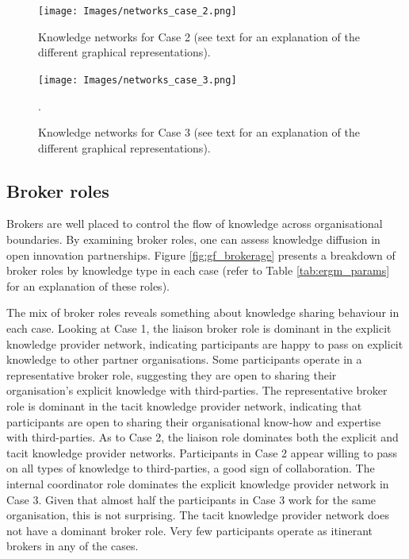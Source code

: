 \begin{figure}
\texttt{[image: Images/networks\_case\_2.png]}
\caption[Knowledge networks for Case 2]{Knowledge networks for Case 2 (see text for an explanation of the different graphical representations).}
\label{fig:network_case_2} 
\end{figure}

\begin{figure}
\texttt{[image: Images/networks\_case\_3.png]}
\caption[Knowledge networks for Case 3]{Knowledge networks for Case 3 (see text for an explanation of the different graphical representations).}. 
\label{fig:network_case_3} 
\end{figure}

\subsection{Broker roles}

Brokers are well placed to control the flow of knowledge across organisational boundaries. By examining broker roles, one can assess knowledge diffusion in open innovation partnerships. Figure \ref{fig:gf_brokerage} presents a breakdown of \citet{gould1989structures} broker roles by knowledge type in each case (refer to Table \ref{tab:ergm_params} for an explanation of these roles).  \medskip

The mix of broker roles reveals something about knowledge sharing behaviour in each case. Looking at Case 1, the liaison broker role is dominant in the explicit knowledge provider network, indicating participants are happy to pass on explicit knowledge to other partner organisations. Some participants operate in a representative broker role, suggesting they are open to sharing their organisation's explicit knowledge with third-parties. The representative broker role is dominant in the tacit knowledge provider network, indicating that participants are open to sharing their organisational know-how and expertise with third-parties. As to Case 2, the liaison role dominates both the explicit and tacit knowledge provider networks. Participants in Case 2 appear willing to pass on all types of knowledge to third-parties, a good sign of collaboration. The internal coordinator role dominates the explicit knowledge provider network in Case 3. Given that almost half the participants in Case 3 work for the same organisation, this is not surprising. The tacit knowledge provider network does not have a dominant broker role. Very few participants operate as itinerant brokers in any of the cases. \medskip


